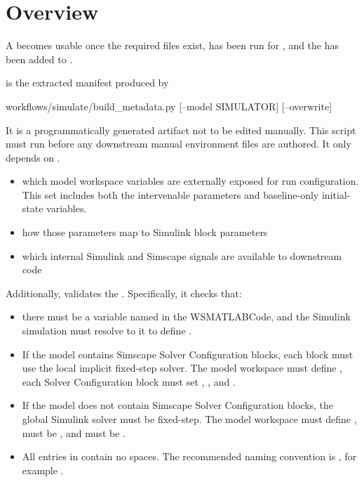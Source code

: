 \documentclass[11pt]{article}
\begin{document}
\label{docstart:simulink_generated_metadata_schema}

\section*{Overview}
A \termSimulator becomes usable once the required files exist,  has been run for , and the \termSimulator has been added to .


\label{sec:simulink-build-metadata-stage}
 is the extracted manifest produced by
\begin{DocCode}
workflows/simulate/build_metadata.py [--model SIMULATOR] [--overwrite]
\end{DocCode}
It is a programmatically generated artifact not to be edited manually.
This script must run before any downstream manual environment files are authored. It only depends on .
\begin{itemize}
\item which model workspace variables are externally exposed for \name{} run configuration. This set includes both the intervenable parameters and baseline-only initial-state variables.
\item how those parameters map to Simulink block parameters
\item which internal Simulink and Simscape signals are available to downstream code
\end{itemize}

Additionally,  validates the . Specifically, it checks that:
\begin{itemize}
  \item there must be a variable named  in the WSMATLABCode, and the Simulink simulation must resolve to it to define .
  \item If the model contains Simscape Solver Configuration blocks, each block must use the local implicit fixed-step solver. The model workspace must define , each Solver Configuration block must set , , and .
  \item If the model does not contain Simscape Solver Configuration blocks, the global Simulink solver must be fixed-step. The model workspace must define ,  must be , and  must be .
  \item All entries in  contain no spaces. The recommended naming convention is , for example .
\end{itemize}
\end{document}
